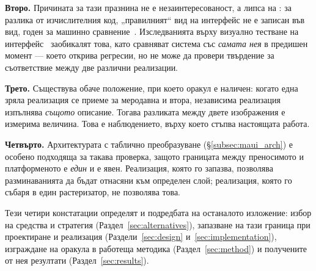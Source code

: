 \textbf{Второ.} Причината за тази празнина не е незаинтересованост, а липса на
: за разлика от изчислителния код, „правилният“ вид на интерфейс не е записан
във вид, годен за машинно сравнение~\cite{barr2015oracle}. Изследванията върху визуално
тестване на интерфейс~\cite{garousi2017vgt} заобикалят това, като сравняват система със
\emph{самата нея} в предишен момент --- което открива регресии, но не може да провери
твърдение за съответствие между две различни реализации.

\textbf{Трето.} Съществува обаче положение, при което оракул е наличен: когато една зряла
реализация се приеме за меродавна и втора, независима реализация изпълнява \emph{същото}
описание. Тогава разликата между двете изображения е измерима величина. Това е
наблюдението, върху което стъпва настоящата работа.

\textbf{Четвърто.} Архитектурата с таблично преобразуване (§\ref{subsec:maui_arch}) е
особено подходяща за такава проверка, защото границата между преносимото и платформеното е
\emph{един} и е явен. Реализация, която го запазва, позволява разминаванията да бъдат
отнасяни към определен слой; реализация, която го събаря в един растеризатор, не позволява
това.

Тези четири констатации определят и подредбата на останалото изложение: избор на средства
и стратегия (Раздел~\ref{sec:alternatives}), запазване на тази граница при проектиране и
реализация (Раздели~\ref{sec:design} и~\ref{sec:implementation}), изграждане на оракула в
работеща методика (Раздел~\ref{sec:method}) и получените от нея резултати
(Раздел~\ref{sec:results}).
